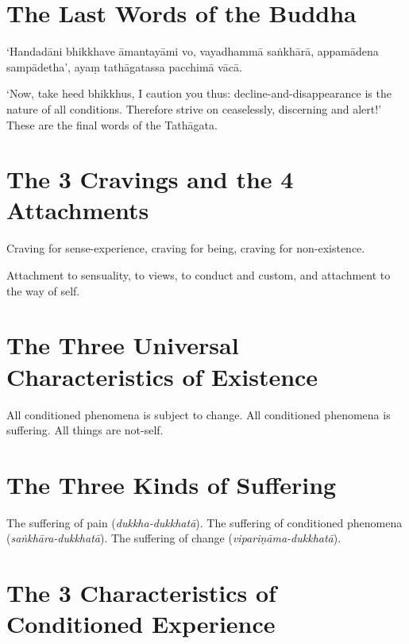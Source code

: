 \section*{The Last Words of the Buddha}

‘Handadāni bhikkhave āmantayāmi vo, vayadhammā saṅkhārā, appamādena sampādetha’,
ayaṃ tathāgatassa pacchimā vācā.

‘Now, take heed bhikkhus, I caution you thus: decline-and-disappearance is the
nature of all conditions. Therefore strive on ceaselessly, discerning and
alert!’ These are the final words of the Tathāgata.


\section*{The 3 Cravings and the 4 Attachments}

Craving for sense-experience, craving for being, craving for non-existence.

Attachment to sensuality, to views, to conduct and custom, and attachment to the
way of self.


\vspace*{-\baselineskip}

\section*{The Three Universal Characteristics of Existence}

All conditioned phenomena is subject to change.
All conditioned phenomena is suffering.
All things are not-self.


\vspace*{-\baselineskip}

\section*{The Three Kinds of Suffering}

The suffering of pain (\emph{dukkha-dukkhatā}).
The suffering of conditioned phenomena (\emph{saṅkhāra-dukkhatā}).
The suffering of change (\emph{vipariṇāma-dukkhatā}).\\
\mbox{}

\section*{The 3 Characteristics of Conditioned Experience}

